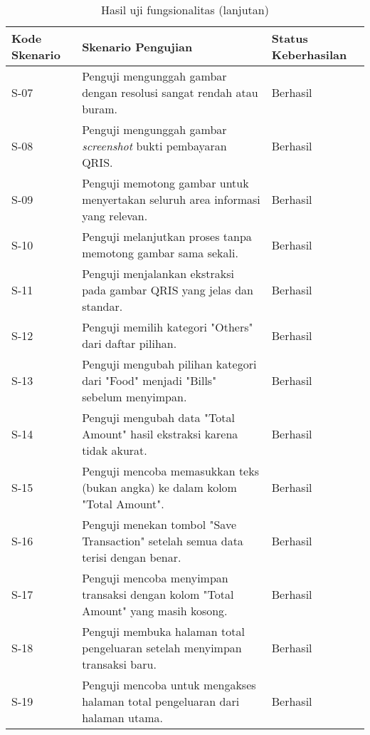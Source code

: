 \begin{table}[h!]
\ContinuedFloat
\caption{Hasil uji fungsionalitas (lanjutan)}
\begin{tabularx}{\linewidth}{|p{2cm}|X|p{2.5cm}|}
\hline
\textbf{Kode Skenario} & \textbf{Skenario Pengujian} & \textbf{Status Keberhasilan} \\
\hline
S-07 & Penguji mengunggah gambar dengan resolusi sangat rendah atau buram. & Berhasil \\
\hline
S-08 & Penguji mengunggah gambar \emph{screenshot} bukti pembayaran QRIS. & Berhasil \\
\hline
S-09 & Penguji memotong gambar untuk menyertakan seluruh area informasi yang relevan. & Berhasil \\
\hline
S-10 & Penguji melanjutkan proses tanpa memotong gambar sama sekali. & Berhasil \\
\hline
S-11 & Penguji menjalankan ekstraksi pada gambar QRIS yang jelas dan standar. & Berhasil \\
\hline
S-12 & Penguji memilih kategori "Others" dari daftar pilihan. & Berhasil \\
\hline
S-13 & Penguji mengubah pilihan kategori dari "Food" menjadi "Bills" sebelum menyimpan. & Berhasil \\
\hline
S-14 & Penguji mengubah data "Total Amount" hasil ekstraksi karena tidak akurat. & Berhasil \\
\hline
S-15 & Penguji mencoba memasukkan teks (bukan angka) ke dalam kolom "Total Amount". & Berhasil \\
\hline
S-16 & Penguji menekan tombol "Save Transaction" setelah semua data terisi dengan benar. & Berhasil \\
\hline
S-17 & Penguji mencoba menyimpan transaksi dengan kolom "Total Amount" yang masih kosong. & Berhasil \\
\hline
S-18 & Penguji membuka halaman total pengeluaran setelah menyimpan transaksi baru. & Berhasil \\
\hline
S-19 & Penguji mencoba untuk mengakses halaman total pengeluaran dari halaman utama. & Berhasil \\
\hline
\end{tabularx}
\end{table}